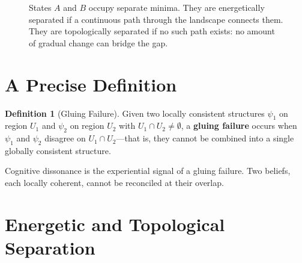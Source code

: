 \documentclass[11pt]{book}
\theoremstyle{plain}
\theoremstyle{definition}
\newtheorem{definition}[theorem]{Definition}
\theoremstyle{remark}
\begin{document}
\begin{figure}[h]
\centering
{}
\caption{States $A$ and $B$ occupy separate minima. They are energetically separated if
a continuous path through the landscape connects them. They are topologically separated
if no such path exists: no amount of gradual change can bridge the gap.}
\end{figure}

\section{A Precise Definition}

\begin{definition}[Gluing Failure]
Given two locally consistent structures $\psi_1$ on region $U_1$ and
$\psi_2$ on region $U_2$ with $U_1 \cap U_2 \neq \emptyset$, a
\textbf{gluing failure} occurs when $\psi_1$ and $\psi_2$ disagree on
$U_1 \cap U_2$---that is, they cannot be combined into a single globally
consistent structure.
\end{definition}

Cognitive dissonance is the experiential signal of a gluing failure. Two
beliefs, each locally coherent, cannot be reconciled at their overlap.

\section{Energetic and Topological Separation}
\end{document}
